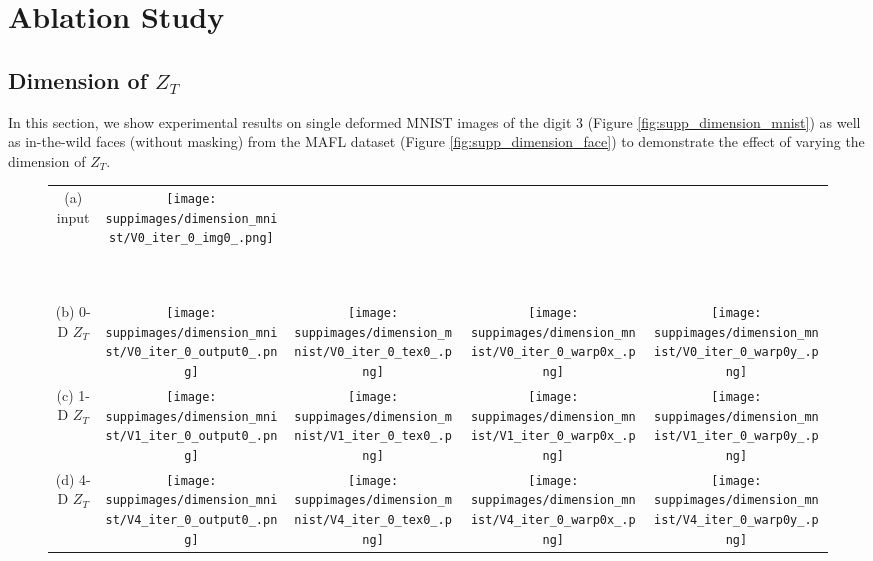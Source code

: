 \documentclass[runningheads]{llncs}
\begin{document}
\section{Ablation Study}
\label{append:ablation}
\subsection{Dimension of $Z_T$}

In this section, we show experimental results on single deformed MNIST images of the digit 3 (Figure \ref{fig:supp_dimension_mnist}) as well as in-the-wild faces (without masking) from the MAFL dataset (Figure \ref{fig:supp_dimension_face}) to demonstrate the effect of varying the dimension of $Z_T$.

\begin{figure}[ht]
	\begin{center}
		\begin{tabular}{c@{\hspace{0.1in}}c@{\hspace{0.1in}}c@{\hspace{0.1in}}c@{\hspace{0.1in}}c}
		(a) input & 
		\texttt{[image: suppimages/dimension\_mnist/V0\_iter\_0\_img0\_.png]} & & &  \\~\\~\\
		
		(b) 0-D $Z_T$ &
		\texttt{[image: suppimages/dimension\_mnist/V0\_iter\_0\_output0\_.png]} &
		\texttt{[image: suppimages/dimension\_mnist/V0\_iter\_0\_tex0\_.png]} &
		\texttt{[image: suppimages/dimension\_mnist/V0\_iter\_0\_warp0x\_.png]} &
		\texttt{[image: suppimages/dimension\_mnist/V0\_iter\_0\_warp0y\_.png]} \\
		
		(c) 1-D $Z_T$ &
		\texttt{[image: suppimages/dimension\_mnist/V1\_iter\_0\_output0\_.png]} &
		\texttt{[image: suppimages/dimension\_mnist/V1\_iter\_0\_tex0\_.png]} &
		\texttt{[image: suppimages/dimension\_mnist/V1\_iter\_0\_warp0x\_.png]} &
		\texttt{[image: suppimages/dimension\_mnist/V1\_iter\_0\_warp0y\_.png]} \\
		
		(d) 4-D $Z_T$ &
		\texttt{[image: suppimages/dimension\_mnist/V4\_iter\_0\_output0\_.png]} &
		\texttt{[image: suppimages/dimension\_mnist/V4\_iter\_0\_tex0\_.png]} &
		\texttt{[image: suppimages/dimension\_mnist/V4\_iter\_0\_warp0x\_.png]} &
		\texttt{[image: suppimages/dimension\_mnist/V4\_iter\_0\_warp0y\_.png]} \\
		

\end{tabular}
\end{center}
\end{figure}
\end{document}
